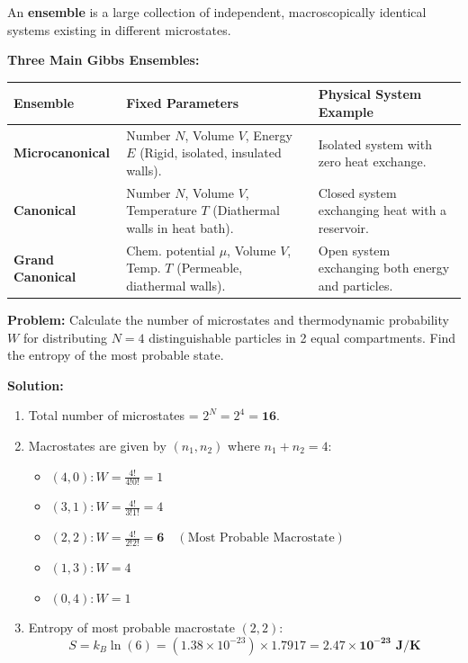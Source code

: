 \documentclass[12pt,a4paper]{article}
\begin{document}
An \textbf{ensemble} is a large collection of independent, macroscopically identical systems existing in different microstates.

\textbf{Three Main Gibbs Ensembles:}\par\vspace{6pt}\noindent
\begin{tabularx}{\linewidth}{|B{3.2cm}|Y|Y|}
\hline
\textbf{Ensemble} & \textbf{Fixed Parameters} & \textbf{Physical System Example} \\
\hline
\textbf{Microcanonical} & Number $N$, Volume $V$, Energy $E$ (Rigid, isolated, insulated walls). & Isolated system with zero heat exchange. \\
\hline
\textbf{Canonical} & Number $N$, Volume $V$, Temperature $T$ (Diathermal walls in heat bath). & Closed system exchanging heat with a reservoir. \\
\hline
\textbf{Grand Canonical} & Chem. potential $\mu$, Volume $V$, Temp. $T$ (Permeable, diathermal walls). & Open system exchanging both energy and particles. \\
\hline
\end{tabularx}

\begin{tcolorbox}[examplebox, title={\textbf{Solved Problem 1: Microstates and Entropy}}]
\textbf{Problem:} Calculate the number of microstates and thermodynamic probability $W$ for distributing $N = 4$ distinguishable particles in 2 equal compartments. Find the entropy of the most probable state.

\textbf{Solution:}\par\noindent
\begin{enumerate}[leftmargin=*, itemsep=2pt]
  \item Total number of microstates = $2^N = 2^4 = \mathbf{16}$.
  \item Macrostates are given by $(n_1, n_2)$ where $n_1 + n_2 = 4$:
  \begin{itemize}[leftmargin=*, itemsep=1pt]
    \item $(4,0): W = \frac{4!}{4!0!} = 1$
    \item $(3,1): W = \frac{4!}{3!1!} = 4$
    \item $(2,2): W = \frac{4!}{2!2!} = \mathbf{6} \quad (\text{Most Probable Macrostate})$
    \item $(1,3): W = 4$
    \item $(0,4): W = 1$
  \end{itemize}
  \item Entropy of most probable macrostate $(2,2)$:
   \begin{equation}
   S = k_B \ln(6) = (1.38 \times 10^{-23}) \times 1.7917 = \mathbf{2.47 \times 10^{-23}\text{ J/K}}
   \end{equation}
\end{enumerate}
\end{tcolorbox}
\end{document}
